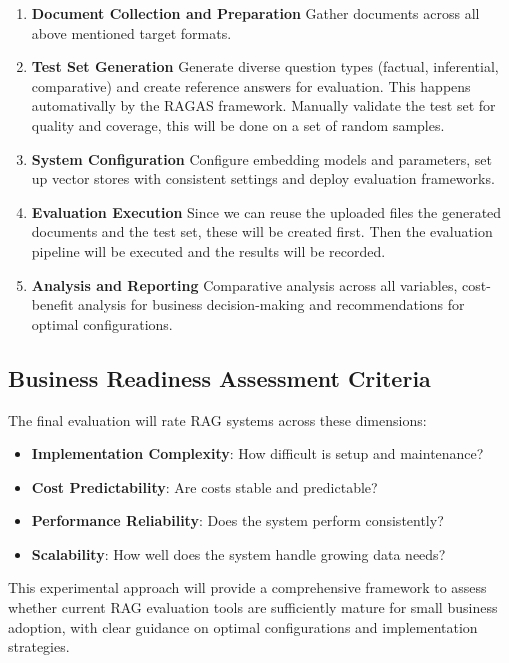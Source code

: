 \begin{enumerate}
    \item \textbf{Document Collection and Preparation}
    Gather documents across all above mentioned target formats.
    
    \item \textbf{Test Set Generation}
    Generate diverse question types (factual, inferential, comparative) and create reference answers for evaluation.
    This happens automativally by the RAGAS framework.
    Manually validate the test set for quality and coverage, this will be done on a set of random samples.
    
    
    \item \textbf{System Configuration}
    Configure embedding models and parameters, set up vector stores with consistent settings and deploy evaluation frameworks.
    
    \item \textbf{Evaluation Execution}
    Since we can reuse the uploaded files the generated documents and the test set, these will be created first.
    Then the evaluation pipeline will be executed and the results will be recorded.
    
    \item \textbf{Analysis and Reporting}
    Comparative analysis across all variables, cost-benefit analysis for business decision-making and recommendations for optimal configurations.
\end{enumerate}

\subsection{Business Readiness Assessment Criteria}

The final evaluation will rate RAG systems across these dimensions:
\begin{itemize}
    \item \textbf{Implementation Complexity}: How difficult is setup and maintenance?
    \item \textbf{Cost Predictability}: Are costs stable and predictable?
    \item \textbf{Performance Reliability}: Does the system perform consistently?
    \item \textbf{Scalability}: How well does the system handle growing data needs?
\end{itemize}

This experimental approach will provide a comprehensive framework to assess whether current RAG evaluation tools are sufficiently mature for small business adoption, with clear guidance on optimal configurations and implementation strategies.


